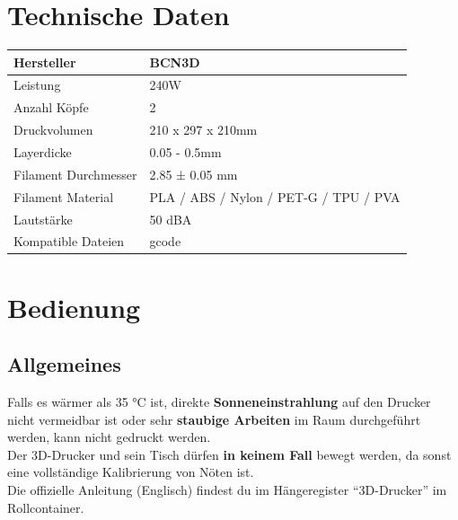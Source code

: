 \documentclass[a4paper]{article}
\begin{document}
\section{Technische Daten}
 \begin{tabular}{|l|l|}
 	\hline
 	Hersteller & BCN3D\\
 	\hline
 	Leistung & 240W \\
 	\hline
 	Anzahl Köpfe & 2 \\
 	\hline
	Druckvolumen &  210 x 297 x 210mm\\
	\hline
	Layerdicke & 0.05 - 0.5mm\\
	\hline
	Filament Durchmesser & 2.85 ± 0.05 mm\\
	\hline
	Filament Material & PLA / ABS / Nylon / PET-G / TPU / PVA\\
	\hline
	Lautstärke & 50 dBA\\
	\hline
	Kompatible Dateien & gcode \\
	\hline
\end{tabular}
\newpage
\section{Bedienung}
\subsection{Allgemeines}
Falls es wärmer als 35 °C ist, direkte \textbf{Sonneneinstrahlung} auf den Drucker nicht vermeidbar ist oder sehr \textbf{staubige Arbeiten} im Raum durchgeführt werden, kann nicht gedruckt werden.\\
Der 3D-Drucker und sein Tisch dürfen \textbf{in keinem Fall} bewegt werden, da sonst eine vollständige Kalibrierung von Nöten ist.\\
Die offizielle Anleitung (Englisch) findest du im Hängeregister "`3D-Drucker"' im Rollcontainer.
\end{document}
